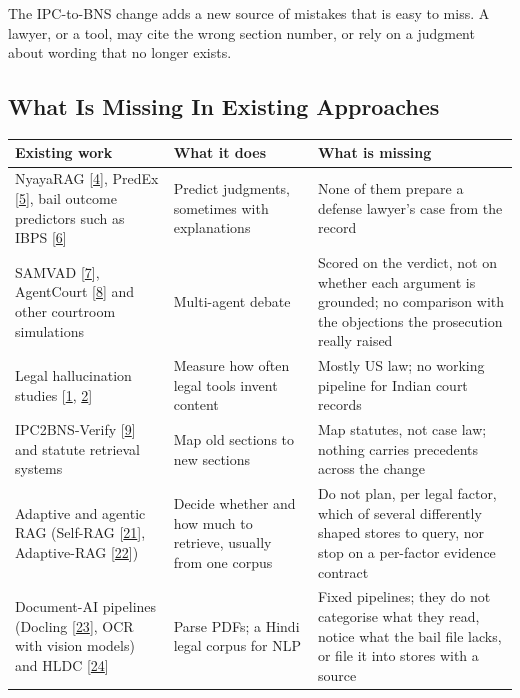 \documentclass[10pt,a4paper]{article}
\begin{document}
The IPC-to-BNS change adds a new source of mistakes that is easy to miss. A lawyer, or a tool, may cite the wrong section number, or rely on a judgment about wording that no longer exists.

\subsection{What Is Missing In Existing Approaches}

{\small
\begin{xltabular}{\linewidth}{@{}>{\raggedright\arraybackslash{}\hsize}X>{\raggedright\arraybackslash{}\hsize}X>{\raggedright\arraybackslash{}\hsize}X@{}}
\toprule
\textbf{Existing work} & \textbf{What it does} & \textbf{What is missing} \\
\midrule
\endhead
NyayaRAG [\href{https://aclanthology.org/2025.ijcnlp-long.92/}{4}], PredEx [\href{https://aclanthology.org/2024.findings-acl.255/}{5}], bail outcome predictors such as IBPS [\href{https://arxiv.org/abs/2508.07592}{6}] & Predict judgments, sometimes with explanations & None of them prepare a defense lawyer's case from the record \\
SAMVAD [\href{https://arxiv.org/abs/2509.03793}{7}], AgentCourt [\href{https://arxiv.org/abs/2408.08089}{8}] and other courtroom simulations & Multi-agent debate & Scored on the verdict, not on whether each argument is grounded; no comparison with the objections the prosecution really raised \\
Legal hallucination studies [\href{https://arxiv.org/abs/2401.01301}{1}, \href{https://arxiv.org/abs/2405.20362}{2}] & Measure how often legal tools invent content & Mostly US law; no working pipeline for Indian court records \\
IPC2BNS-Verify [\href{https://github.com/MS-406/IPC2BNS-Verify}{9}] and statute retrieval systems & Map old sections to new sections & Map statutes, not case law; nothing carries precedents across the change \\
Adaptive and agentic RAG (Self-RAG [\href{https://arxiv.org/abs/2310.11511}{21}], Adaptive-RAG [\href{https://arxiv.org/abs/2403.14403}{22}]) & Decide whether and how much to retrieve, usually from one corpus & Do not plan, per legal factor, which of several differently shaped stores to query, nor stop on a per-factor evidence contract \\
Document-AI pipelines (Docling [\href{https://arxiv.org/abs/2408.09869}{23}], OCR with vision models) and HLDC [\href{https://arxiv.org/abs/2204.00806}{24}] & Parse PDFs; a Hindi legal corpus for NLP & Fixed pipelines; they do not categorise what they read, notice what the bail file lacks, or file it into stores with a source \\
\bottomrule
\end{xltabular}}
\end{document}
